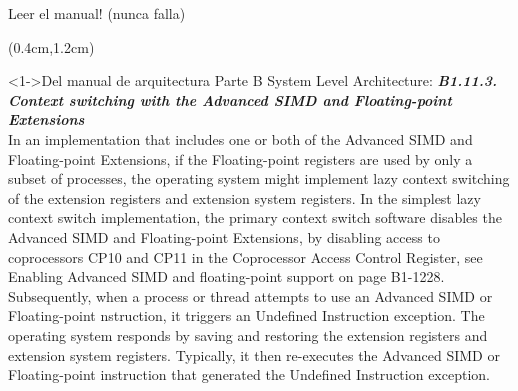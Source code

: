 \begin{frame}{Leer el manual! (nunca falla)}
 \begin{textblock*}{\textwidth}(0.4cm,1.2cm)
  \begin{block}<1->{Del manual de arquitectura Parte B System Level Architecture:} \justifying \scriptsize
\textit{\textbf{B1.11.3. Context switching with the Advanced SIMD and Floating-point Extensions}}\\
In an implementation that includes one or both of the Advanced SIMD and Floating-point Extensions, if the Floating-point registers are used by only a subset of processes, the operating system might implement lazy context switching of the extension registers and extension system registers. In the simplest lazy context switch implementation, the primary context switch software disables the Advanced SIMD and Floating-point Extensions, by disabling access to coprocessors CP10 and CP11 in the Coprocessor Access Control Register, see Enabling Advanced SIMD and floating-point support on page B1-1228. Subsequently, when a process or thread attempts to use an Advanced SIMD or Floating-point nstruction, it triggers an Undefined Instruction exception. The operating system responds by saving and restoring the extension registers and extension system registers. Typically, it then re-executes the Advanced SIMD or Floating-point instruction that generated the Undefined Instruction exception.
  \end{block}
 \end{textblock*}
\end{frame}

